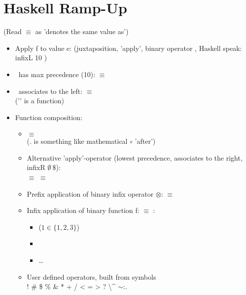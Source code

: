 

\chapter{Haskell Ramp-Up} %
\label{cha:haskell_ramp_up}

(Read $\equiv$ as 'denotes the same value as')

\begin{itemize}
    \item Apply f to value e:  (juxtaposition, 'apply', binary operator \textvisiblespace, Haskell speak: infixL 10 \textvisiblespace)
    \item \textvisiblespace\ has max precedence (10):  $\equiv$ 
    \item \textvisiblespace\ associates to the left:  $\equiv$  \\ ('' is a function) \item Function composition: \begin{itemize}
        \item {} $\equiv$  \\ (. is something like mathematical $\circ$ 'after')
        \item Alternative 'apply'-operator \codeline{\$} (lowest precedence, associates to the right, infixR $\emptyset\ \$$):\\
             $\equiv$  $\equiv$ 
        \item Prefix application of binary infix operator $\otimes$:  $\equiv$  
        \item Infix application of binary function f:  $\equiv$ :
        \begin{itemize}
            \item {}   ($1 \in \{1,2,3\}$)
            \item {}
            \item \dots
        \end{itemize}
        \item User defined operators, built from symbols \\ ! \# \$ \% \& * + / < = > ? \@ \textbackslash \string^ \textbar $\sim$:.
    \end{itemize}
\end{itemize} 



